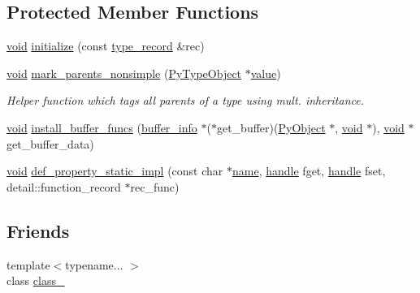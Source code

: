 \subsection*{Protected Member Functions}
\begin{DoxyCompactItemize}
\item 
\mbox{\hyperlink{_s_d_l__opengles2__gl2ext_8h_ae5d8fa23ad07c48bb609509eae494c95}{void}} \mbox{\hyperlink{classgeneric__type_a0eaa0586a2e56b3e69d296572ca7091e}{initialize}} (const \mbox{\hyperlink{structtype__record}{type\+\_\+record}} \&rec)
\item 
\mbox{\hyperlink{_s_d_l__opengles2__gl2ext_8h_ae5d8fa23ad07c48bb609509eae494c95}{void}} \mbox{\hyperlink{classgeneric__type_aa102cbe989b604345c02dcd821f6c5b2}{mark\+\_\+parents\+\_\+nonsimple}} (\mbox{\hyperlink{_python27_2object_8h_a42a55dd6e973872c7a6bc61632070f6f}{Py\+Type\+Object}} $\ast$\mbox{\hyperlink{_s_d_l__opengl__glext_8h_a8ad81492d410ff2ac11f754f4042150f}{value}})
\begin{DoxyCompactList}\small\item\em Helper function which tags all parents of a type using mult. inheritance. \end{DoxyCompactList}\item 
\mbox{\hyperlink{_s_d_l__opengles2__gl2ext_8h_ae5d8fa23ad07c48bb609509eae494c95}{void}} \mbox{\hyperlink{classgeneric__type_abc4faaa9d97d488abb99634dc3f0b88f}{install\+\_\+buffer\+\_\+funcs}} (\mbox{\hyperlink{structbuffer__info}{buffer\+\_\+info}} $\ast$($\ast$get\+\_\+buffer)(\mbox{\hyperlink{_python27_2object_8h_aadc84ac7aed2cfa6f20c25f62bf3dac7}{Py\+Object}} $\ast$, \mbox{\hyperlink{_s_d_l__opengles2__gl2ext_8h_ae5d8fa23ad07c48bb609509eae494c95}{void}} $\ast$), \mbox{\hyperlink{_s_d_l__opengles2__gl2ext_8h_ae5d8fa23ad07c48bb609509eae494c95}{void}} $\ast$get\+\_\+buffer\+\_\+data)
\item 
\mbox{\hyperlink{_s_d_l__opengles2__gl2ext_8h_ae5d8fa23ad07c48bb609509eae494c95}{void}} \mbox{\hyperlink{classgeneric__type_af4b8e335e3a6f25b38c522c2c4f4c692}{def\+\_\+property\+\_\+static\+\_\+impl}} (const char $\ast$\mbox{\hyperlink{structname}{name}}, \mbox{\hyperlink{classhandle}{handle}} fget, \mbox{\hyperlink{classhandle}{handle}} fset, detail\+::function\+\_\+record $\ast$rec\+\_\+func)
\end{DoxyCompactItemize}
\subsection*{Friends}
\begin{DoxyCompactItemize}
\item 
{\footnotesize template$<$typename... $>$ }\\class \mbox{\hyperlink{classgeneric__type_a978adea7a2c683287b544ebc130469fb}{class\+\_\+}}
\end{DoxyCompactItemize}
